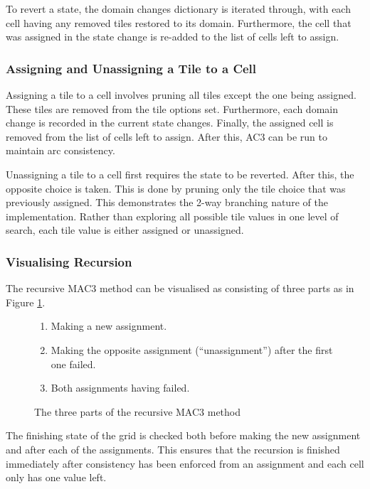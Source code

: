 
To revert a state, the domain changes dictionary is iterated through, with each cell having any removed tiles restored to its domain. Furthermore, the cell that was assigned in the state change is re-added to the list of cells left to assign.

\subsubsection{Assigning and Unassigning a Tile to a Cell}
Assigning a tile to a cell involves pruning all tiles except the one being assigned. These tiles are removed from the tile options set. Furthermore, each domain change is recorded in the current state changes. Finally, the assigned cell is removed from the list of cells left to assign. After this, AC3 can be run to maintain arc consistency.


Unassigning a tile to a cell first requires the state to be reverted. After this, the opposite choice is taken. This is done by pruning only the tile choice that was previously assigned. This demonstrates the 2-way branching nature of the implementation. Rather than exploring all possible tile values in one level of search, each tile value is either assigned or unassigned.

\subsubsection{Visualising Recursion}
The recursive MAC3 method can be visualised as consisting of three parts as in Figure \ref{fig:mac3Recursion}.

\begin{figure}[H]
    \begin{framed}
    \begin{enumerate}
        \item Making a new assignment.
        \item Making the opposite assignment (``unassignment'') after the first one failed.
        \item Both assignments having failed.
    \end{enumerate}
    \end{framed}
    \caption{The three parts of the recursive MAC3 method}
    \label{fig:mac3Recursion}
\end{figure}

The finishing state of the grid is checked both before making the new assignment and after each of the assignments. This ensures that the recursion is finished immediately after consistency has been enforced from an assignment and each cell only has one value left.